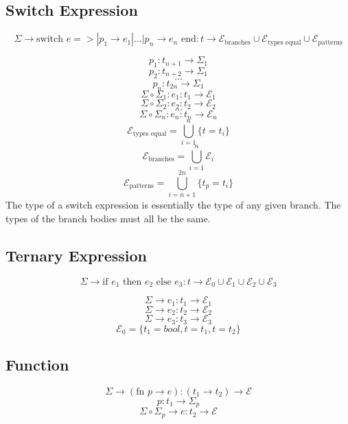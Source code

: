\documentclass[titlepage]{article}
\begin{document}
\subsection{Switch Expression}


$$\Sigma \rightarrow \text{switch } e => | p_1 \rightarrow e_1 | ... | p_n \rightarrow e_n \text{ end} : t \rightarrow \mathcal{E}_\text{branches} \cup \mathcal{E}_\text{types equal} \cup \mathcal{E}_\text{patterns}$$
\noindent\makebox[\linewidth]{\rule{4.9in}{0.4pt}}

$$p_1 : t_{n + 1} \rightarrow \Sigma_1$$
$$p_2 : t_{n + 2} \rightarrow \Sigma_1$$
$$\dots$$
$$p_n : t_{2n} \rightarrow \Sigma_1$$
$$\Sigma \circ \Sigma_1: e_1 : t_1 \rightarrow \mathcal{E}_1$$
$$\Sigma \circ \Sigma_2: e_2 : t_2 \rightarrow \mathcal{E}_2$$
$$\dots$$
$$\Sigma \circ \Sigma_n: e_n : t_n \rightarrow \mathcal{E}_n$$
$$\mathcal{E}_\text{types equal} = \bigcup _ {i = 1} ^ n \{t = t_i\}$$
$$\mathcal{E}_\text{branches} = \bigcup _ {i = 1} ^ n \mathcal{E}_i$$
$$\mathcal{E}_\text{patterns} = \bigcup _ {i = n + 1} ^ {2n} \{t_p = t_i\}$$
The type of a switch expression is essentially the type of any given branch. The types of the branch bodies must all be the same.


\subsection{Ternary Expression}

$$\Sigma \rightarrow \text{if } e_1 \text{ then } e_2 \text{ else } e_3 : t \rightarrow \mathcal{E}_0 \cup \mathcal{E}_1 \cup \mathcal{E}_2 \cup \mathcal{E}_3$$
\noindent\makebox[\linewidth]{\rule{3.4in}{0.4pt}}

$$\Sigma \rightarrow e_1 : t_1 \rightarrow \mathcal{E}_1$$
$$\Sigma \rightarrow e_2 : t_2 \rightarrow \mathcal{E}_2$$
$$\Sigma \rightarrow e_3 : t_3 \rightarrow \mathcal{E}_3$$
$$\mathcal{E}_0 = \{t_1 = bool, t = t_1, t = t_2\}$$

\subsection{Function}

$$\Sigma \rightarrow (\text{fn } p \rightarrow e) : (t_1 \rightarrow t_2) \rightarrow \mathcal{E}$$
\noindent\makebox[\linewidth]{\rule{2.25in}{0.4pt}}
$$p : t_1 \rightarrow \Sigma_p$$
$$\Sigma \circ \Sigma_p \rightarrow e : t_2 \rightarrow \mathcal{E}$$
\end{document}
